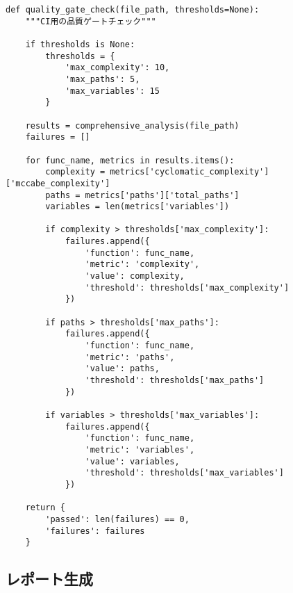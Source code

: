 \documentclass[12pt,a4paper]{article}
\begin{document}
\begin{lstlisting}[caption=CI用品質チェック]
def quality_gate_check(file_path, thresholds=None):
    """CI用の品質ゲートチェック"""

    if thresholds is None:
        thresholds = {
            'max_complexity': 10,
            'max_paths': 5,
            'max_variables': 15
        }

    results = comprehensive_analysis(file_path)
    failures = []

    for func_name, metrics in results.items():
        complexity = metrics['cyclomatic_complexity']['mccabe_complexity']
        paths = metrics['paths']['total_paths']
        variables = len(metrics['variables'])

        if complexity > thresholds['max_complexity']:
            failures.append({
                'function': func_name,
                'metric': 'complexity',
                'value': complexity,
                'threshold': thresholds['max_complexity']
            })

        if paths > thresholds['max_paths']:
            failures.append({
                'function': func_name,
                'metric': 'paths',
                'value': paths,
                'threshold': thresholds['max_paths']
            })

        if variables > thresholds['max_variables']:
            failures.append({
                'function': func_name,
                'metric': 'variables',
                'value': variables,
                'threshold': thresholds['max_variables']
            })

    return {
        'passed': len(failures) == 0,
        'failures': failures
    }
\end{lstlisting}

\subsection{レポート生成}
\end{document}
